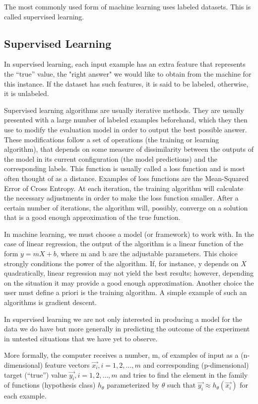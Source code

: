 The most commonly used form of machine learning uses labeled datasets. This is called supervised learning.

\subsection{Supervised Learning}
\label{subsec:supervised-learning}

In supervised learning, each input example has an extra feature that represents the “true” value, the "right answer" we would like to obtain from the machine for this instance. If the dataset has such features, it is said to be labeled, otherwise, it is unlabeled.

Supervised learning algorithms are usually iterative methods. They are usually presented with a large number of labeled examples beforehand, which they then use to modify the evaluation model in order to output the best possible answer. These modifications follow a set of operations (the training or learning algorithm), that depends on some measure of dissimilarity between the outputs of the model in its current configuration (the model predictions) and the corresponding labels. This function is usually called a loss function and is most often thought of as a distance. Examples of loss functions are the Mean-Squared Error of Cross Entropy. At each iteration, the training algorithm will calculate the necessary adjustments in order to make the loss function smaller. After a certain number of iterations, the algorithm will, possibly, converge on a solution that is a good enough approximation of the true function.

In machine learning, we must choose a model (or framework) to work with. In the case of linear regression, the output of the algorithm is a linear function of the form $y = mX + b$, where m and b are the adjustable parameters. This choice strongly conditions the power of the algorithm. If, for instance, y depends on $X$ quadratically, linear regression may not yield the best results; however, depending on the situation it may provide a good enough approximation.
Another choice the user must define a priori is the training algorithm. A simple example of such an algorithms is gradient descent. 

In supervised learning we are not only interested in producing a model for the data we do have but more generally in predicting the outcome of the experiment in untested situations that we have yet to observe.

More formally, the computer receives a number, m, of examples of input as a (n-dimensional) feature vectors $\vec{x_i}, i = 1,2, \ldots ,m$ and corresponding (p-dimensional) target (“true”) value $\vec{ y_i}, i=1,2, \ldots ,m$ and tries to find the element in the family of functions (hypothesis class) $h_{\theta}$ parameterized by $\theta$ such that $\vec{ y_i}  \approx h_\theta \left(\vec {x_i} \right)$ for each example. 

